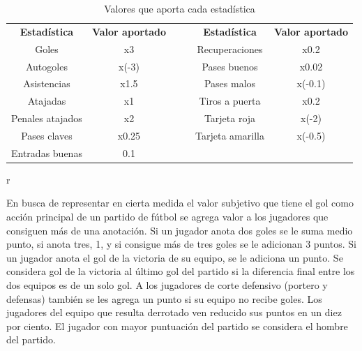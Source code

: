 \begin{table}[]
    \begin{center}
        

    \begin{tabular}{|c|c|llcc}
    \cline{1-2} \cline{5-6}
    \textbf{Estadística} &
      \textbf{Valor aportado} &
      \multicolumn{2}{l|}{\multirow{4}{*}{}} &
      \multicolumn{1}{c|}{\textbf{Estadística}} &
      \multicolumn{1}{c|}{\textbf{Valor aportado}} \\ \cline{1-2} \cline{5-6} 
    Goles            & x3    & \multicolumn{2}{l|}{}    & \multicolumn{1}{c|}{Recuperaciones} & \multicolumn{1}{c|}{x0.2}    \\ \cline{1-2} \cline{5-6} 
    Autogoles        & x(-3) & \multicolumn{2}{l|}{}    & \multicolumn{1}{c|}{Pases buenos}   & \multicolumn{1}{c|}{x0.02}   \\ \cline{1-2} \cline{5-6} 
    Asistencias      & x1.5  & \multicolumn{2}{l|}{}    & \multicolumn{1}{c|}{Pases malos}    & \multicolumn{1}{c|}{x(-0.1)} \\ \cline{1-2} \cline{5-6} 
    Atajadas         & x1    &  & \multicolumn{1}{l|}{} & \multicolumn{1}{c|}{Tiros a puerta} & \multicolumn{1}{c|}{x0.2}    \\ \cline{1-2} \cline{5-6} 
    Penales atajados & x2    &  & \multicolumn{1}{l|}{} & \multicolumn{1}{c|}{Tarjeta roja}    & \multicolumn{1}{c|}{x(-2)}   \\ \cline{1-2} \cline{5-6} 
    Pases claves     & x0.25 &  & \multicolumn{1}{l|}{} & \multicolumn{1}{c|}{Tarjeta amarilla} & \multicolumn{1}{c|}{x(-0.5)} \\ \cline{1-2} \cline{5-6} 
    Entradas buenas  & 0.1   &  &                       &                                     &                              \\ \cline{1-2}
    \end{tabular}r
    \end{center}
    \caption{Valores que aporta cada estadística}
    \label{tab:tablaheuristica}
    \end{table}

    En busca de representar en cierta medida el valor subjetivo que tiene el gol como acción principal de un partido de fútbol se agrega valor a los jugadores que 
consiguen más de una anotación. Si un jugador anota dos goles se le suma medio punto, si anota tres, 1, y si consigue más de tres goles se le adicionan 3 puntos. 
Si un jugador anota el gol de la victoria de su equipo, se le 
adiciona un punto.  Se considera gol de la victoria al último gol del partido si la diferencia final entre los dos equipos es de un solo gol. A los 
jugadores de corte defensivo (portero y defensas) también se les agrega un punto si su equipo no recibe goles. Los jugadores del equipo que resulta derrotado ven 
reducido sus puntos en un diez por ciento. El jugador con mayor puntuación del partido se considera el hombre del partido.



